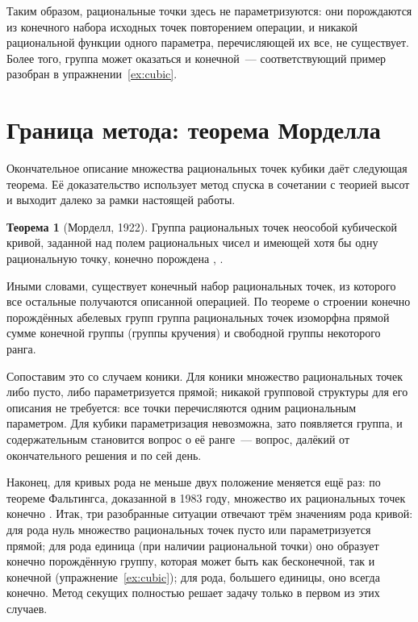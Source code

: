 \documentclass[a4paper,14pt]{extreport}
\theoremstyle{definition}
\newtheorem{thm}{Теорема}[chapter]
\begin{document}
Таким образом, рациональные точки здесь не параметризуются: они порождаются
из конечного набора исходных точек повторением операции, и никакой рациональной
функции одного параметра, перечисляющей их все, не существует. Более того,
группа может оказаться и конечной~--- соответствующий пример разобран в
упражнении~\ref{ex:cubic}.

\section{Граница метода: теорема Морделла}

Окончательное описание множества рациональных точек кубики даёт следующая
теорема. Её доказательство использует метод спуска в сочетании с теорией высот
и выходит далеко за рамки настоящей работы.

\begin{thm}[Морделл, 1922]\label{thm:mordell}
Группа рациональных точек неособой кубической кривой, заданной над полем
рациональных чисел и имеющей хотя бы одну рациональную точку, конечно порождена
\cite[гл.~III]{silverman}, \cite[гл.~10]{cassels}.
\end{thm}

Иными словами, существует конечный набор рациональных точек, из которого все
остальные получаются описанной операцией. По теореме о строении конечно
порождённых абелевых групп группа рациональных точек изоморфна прямой сумме
конечной группы (группы кручения) и свободной группы некоторого ранга.

Сопоставим это со случаем коники. Для коники множество рациональных точек либо
пусто, либо параметризуется прямой; никакой групповой структуры для его описания
не требуется: все точки перечисляются одним рациональным параметром. Для
кубики параметризация невозможна, зато появляется группа, и содержательным
становится вопрос о её ранге~--- вопрос, далёкий от окончательного решения и по
сей день.

Наконец, для кривых рода не меньше двух положение меняется ещё раз: по теореме
Фальтингса, доказанной в 1983 году, множество их рациональных точек конечно
\cite[\S~6]{ostrik}. Итак, три разобранные ситуации отвечают трём
значениям рода кривой: для рода нуль множество рациональных точек пусто или
параметризуется прямой; для рода единица (при наличии рациональной точки) оно
образует конечно порождённую группу, которая может быть как бесконечной, так и
конечной (упражнение~\ref{ex:cubic}); для рода, большего единицы, оно всегда
конечно. Метод секущих
полностью решает задачу только в первом из этих случаев.
\end{document}
